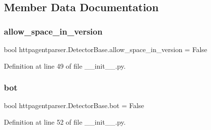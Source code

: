 \subsection{Member Data Documentation}
\hypertarget{classhttpagentparser_1_1_detector_base_a6e4db0b56bf17e62aa020691b3ed50c2}{}\label{classhttpagentparser_1_1_detector_base_a6e4db0b56bf17e62aa020691b3ed50c2} 
\subsubsection{\texorpdfstring{allow\+\_\+space\+\_\+in\+\_\+version}{allow\_space\_in\_version}}
{\footnotesize\ttfamily bool httpagentparser.\+Detector\+Base.\+allow\+\_\+space\+\_\+in\+\_\+version = False\hspace{0.3cm}{\ttfamily [static]}}



Definition at line 49 of file \+\_\+\+\_\+init\+\_\+\+\_\+.\+py.

\hypertarget{classhttpagentparser_1_1_detector_base_a4bf468cc9b57354739b6c3dab7d24ef8}{}\label{classhttpagentparser_1_1_detector_base_a4bf468cc9b57354739b6c3dab7d24ef8} 
\subsubsection{\texorpdfstring{bot}{bot}}
{\footnotesize\ttfamily bool httpagentparser.\+Detector\+Base.\+bot = False\hspace{0.3cm}{\ttfamily [static]}}



Definition at line 52 of file \+\_\+\+\_\+init\+\_\+\+\_\+.\+py.

\hypertarget{classhttpagentparser_1_1_detector_base_a1d3e4527904af7d8f4ddb31b7a4d13ce}{}\label{classhttpagentparser_1_1_detector_base_a1d3e4527904af7d8f4ddb31b7a4d13ce} 
